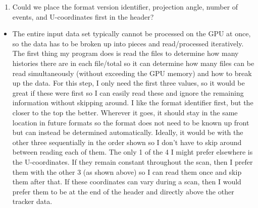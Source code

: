 \documentclass{article}
\begin{document}
\begin{enumerate}[label = (\arabic*), leftmargin = 0.0cm, series = section]
\bfseries
\item Could we place the format version identifier, projection angle, number of events, and U-coordinates first in the header?  
\end{enumerate}
\begin{itemize}
    \item The entire input data set typically cannot be processed on the GPU at once, so the data has to be broken up into pieces and read/processed iteratively.  The first thing my program does is read the files to determine how many histories there are in each file/total so it can determine how many files can be read simultaneously (without exceeding the GPU memory) and how to break up the data.  For this step, I only need the first three values, so it would be great if these were first so I can easily read these and ignore the remaining information without skipping around.  I like the format identifier first, but the closer to the top the better.  Wherever it goes, it should stay in the same location in future formats so the format does not need to be known up front but can instead be determined automatically.  Ideally, it would be with the other three sequentially in the order shown so I don't have to skip around between reading each of them.  The only 1 of the 4 I might prefer elsewhere is the U-coordinates.  If they remain constant throughout the scan, then I prefer them with the other 3 (as shown above) so I can read them once and skip them after that.  If these coordinates can vary during a scan, then I would prefer them to be at the end of the header and directly above the other tracker data.
\end{itemize}
\end{document}
